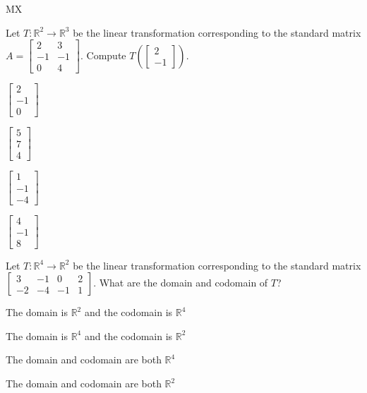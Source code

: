 \documentclass{article}
\newcommand{\IR}{\mathbb{R}}
\begin{document}
\begin{module}{MX}{}
\begin{readinessAssuranceTest}
\item Let $T: \IR^2 \rightarrow \IR^3$ be the linear transformation corresponding to the standard matrix $A=\begin{bmatrix} 2 & 3 \\ -1 & -1 \\ 0 & 4 \end{bmatrix}$.  Compute $T\left(\begin{bmatrix} 2 \\ -1 \end{bmatrix}\right)$.
\begin{multicols}{4}
\begin{readinessAssuranceTestChoices}
\item $\begin{bmatrix} 2 \\ -1 \\ 0 \end{bmatrix}$
\item $\begin{bmatrix} 5 \\ 7 \\ 4\end{bmatrix}$
\item $\begin{bmatrix} 1 \\ -1 \\ -4 \end{bmatrix}$ %
\item $\begin{bmatrix} 4 \\ -1 \\ 8 \end{bmatrix}$
\end{readinessAssuranceTestChoices}
\end{multicols}

\newpage
\item Let \(T: \IR^4 \rightarrow \IR^2\) be the linear transformation corresponding to the standard matrix \(\begin{bmatrix} 3 & -1 & 0 & 2 \\ -2 & -4 & -1 & 1 \end{bmatrix} \).  What are the domain and codomain of \(T\)?
\begin{readinessAssuranceTestChoices}
\item The domain is \(\IR^2\) and the codomain is \(\IR^4\)
\item The domain is \(\IR^4\) and the codomain is \(\IR^2\) %
\item The domain and codomain are both \(\IR^4\)
\item The domain and codomain are both \(\IR^2\)
\end{readinessAssuranceTestChoices}


\end{readinessAssuranceTest}
\end{module}
\end{document}
